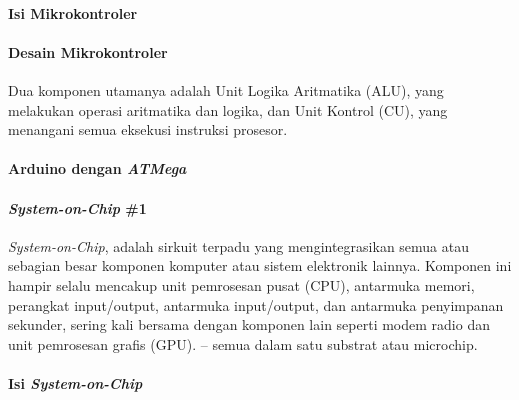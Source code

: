\begin{frame}{\insertsectionhead}
	\framesubtitle{Isi Mikrokontroler}
	\justifying
	\begin{figure}[ht!]
		\begin{subfigure}[b]{0.5\textwidth}
		\end{subfigure}
	\end{figure}
\end{frame}

\begin{frame}{\insertsectionhead}
	\framesubtitle{Desain Mikrokontroler}
	\justifying
	Dua komponen utamanya adalah Unit Logika Aritmatika (ALU), yang melakukan operasi aritmatika dan logika, dan Unit Kontrol (CU), yang menangani semua eksekusi instruksi prosesor.
	\vfill
	\begin{figure}[ht!]
		\begin{subfigure}[b]{0.7\textwidth}
		\end{subfigure}
	\end{figure}
\end{frame}

\begin{frame}{\insertsectionhead}
	\framesubtitle{Arduino dengan \textit{ATMega}}
	\justifying
	\begin{figure}[ht!]
		\begin{subfigure}[b]{0.5\textwidth}
		\end{subfigure}
	\end{figure}
\end{frame}

\begin{frame}{\insertsectionhead}
	\framesubtitle{\textit{System-on-Chip} \#1}
	\justifying
	\textit{System-on-Chip}, adalah sirkuit terpadu yang mengintegrasikan semua atau sebagian besar komponen komputer atau sistem elektronik lainnya. Komponen ini hampir selalu mencakup unit pemrosesan pusat (CPU), antarmuka memori, perangkat input/output, antarmuka input/output, dan antarmuka penyimpanan sekunder, sering kali bersama dengan komponen lain seperti modem radio dan unit pemrosesan grafis (GPU). – semua dalam satu substrat atau microchip.
\end{frame}

\begin{frame}{\insertsectionhead}
	\framesubtitle{Isi \textit{System-on-Chip}}
	\justifying
	\begin{figure}[ht!]
		\begin{subfigure}[b]{0.65\textwidth}
		\end{subfigure}
	\end{figure}
\end{frame}

